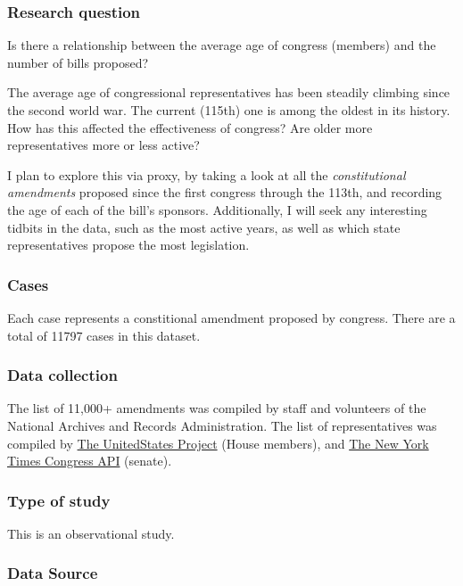 \documentclass[]{article}
\begin{document}
\subsubsection{Research question}\label{research-question}

Is there a relationship between the average age of congress (members)
and the number of bills proposed?

The average age of congressional representatives has been steadily
climbing since the second world war. The current (115th) one is among
the oldest in its history. How has this affected the effectiveness of
congress? Are older more representatives more or less active?

I plan to explore this via proxy, by taking a look at all the
\emph{constitutional amendments} proposed since the first congress
through the 113th, and recording the age of each of the bill's sponsors.
Additionally, I will seek any interesting tidbits in the data, such as
the most active years, as well as which state representatives propose
the most legislation.

\subsubsection{Cases}\label{cases}

Each case represents a constitional amendment proposed by congress.
There are a total of 11797 cases in this dataset.

\subsubsection{Data collection}\label{data-collection}

The list of 11,000+ amendments was compiled by staff and volunteers of
the National Archives and Records Administration. The list of
representatives was compiled by \href{https://theunitedstates.io/}{The
UnitedStates Project} (House members), and
\href{https://developer.nytimes.com/}{The New York Times Congress API}
(senate).

\subsubsection{Type of study}\label{type-of-study}

This is an observational study.

\subsubsection{Data Source}\label{data-source}
\end{document}
